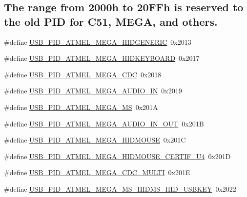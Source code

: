 \subsection*{\-The range from 2000h to 20\-F\-Fh is reserved to the old \-P\-I\-D for \-C51, \-M\-E\-G\-A, and others.}
\begin{DoxyCompactItemize}
\item 
\#define \hyperlink{group__usb__atmel__ids__group_gae24888f62e3e64cb01fde415bf712964}{\-U\-S\-B\-\_\-\-P\-I\-D\-\_\-\-A\-T\-M\-E\-L\-\_\-\-M\-E\-G\-A\-\_\-\-H\-I\-D\-G\-E\-N\-E\-R\-I\-C}~0x2013
\item 
\#define \hyperlink{group__usb__atmel__ids__group_ga6ffa25d6fd7b99faffb10811165a5cbc}{\-U\-S\-B\-\_\-\-P\-I\-D\-\_\-\-A\-T\-M\-E\-L\-\_\-\-M\-E\-G\-A\-\_\-\-H\-I\-D\-K\-E\-Y\-B\-O\-A\-R\-D}~0x2017
\item 
\#define \hyperlink{group__usb__atmel__ids__group_ga433805be6787a174140c0b140cd3b19c}{\-U\-S\-B\-\_\-\-P\-I\-D\-\_\-\-A\-T\-M\-E\-L\-\_\-\-M\-E\-G\-A\-\_\-\-C\-D\-C}~0x2018
\item 
\#define \hyperlink{group__usb__atmel__ids__group_ga691d09a8572063b5408687f3c0812397}{\-U\-S\-B\-\_\-\-P\-I\-D\-\_\-\-A\-T\-M\-E\-L\-\_\-\-M\-E\-G\-A\-\_\-\-A\-U\-D\-I\-O\-\_\-\-I\-N}~0x2019
\item 
\#define \hyperlink{group__usb__atmel__ids__group_gac3fdf47be4d8a57253ea554c086890a2}{\-U\-S\-B\-\_\-\-P\-I\-D\-\_\-\-A\-T\-M\-E\-L\-\_\-\-M\-E\-G\-A\-\_\-\-M\-S}~0x201\-A
\item 
\#define \hyperlink{group__usb__atmel__ids__group_ga3e31683337b6ffe668a82e4b0665033a}{\-U\-S\-B\-\_\-\-P\-I\-D\-\_\-\-A\-T\-M\-E\-L\-\_\-\-M\-E\-G\-A\-\_\-\-A\-U\-D\-I\-O\-\_\-\-I\-N\-\_\-\-O\-U\-T}~0x201\-B
\item 
\#define \hyperlink{group__usb__atmel__ids__group_ga262ddbd401f791b4e05bd9d0691b5524}{\-U\-S\-B\-\_\-\-P\-I\-D\-\_\-\-A\-T\-M\-E\-L\-\_\-\-M\-E\-G\-A\-\_\-\-H\-I\-D\-M\-O\-U\-S\-E}~0x201\-C
\item 
\#define \hyperlink{group__usb__atmel__ids__group_ga3b4af600b6b2b5afc7ca55a6686d9bea}{\-U\-S\-B\-\_\-\-P\-I\-D\-\_\-\-A\-T\-M\-E\-L\-\_\-\-M\-E\-G\-A\-\_\-\-H\-I\-D\-M\-O\-U\-S\-E\-\_\-\-C\-E\-R\-T\-I\-F\-\_\-\-U4}~0x201\-D
\item 
\#define \hyperlink{group__usb__atmel__ids__group_ga2a5eaaf1184fd8295e0fa4c95d0d2be2}{\-U\-S\-B\-\_\-\-P\-I\-D\-\_\-\-A\-T\-M\-E\-L\-\_\-\-M\-E\-G\-A\-\_\-\-C\-D\-C\-\_\-\-M\-U\-L\-T\-I}~0x201\-E
\item 
\#define \hyperlink{group__usb__atmel__ids__group_ga79aa6a09475a9fbcbb30416b7752349e}{\-U\-S\-B\-\_\-\-P\-I\-D\-\_\-\-A\-T\-M\-E\-L\-\_\-\-M\-E\-G\-A\-\_\-\-M\-S\-\_\-\-H\-I\-D\-M\-S\-\_\-\-H\-I\-D\-\_\-\-U\-S\-B\-K\-E\-Y}~0x2022

\end{DoxyCompactItemize}
